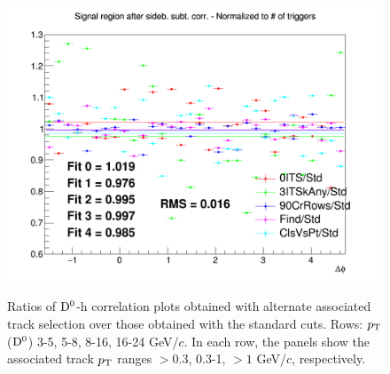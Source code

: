 \begin{figure}
{\includegraphics[width=0.31\linewidth]{figuresVsCent/Dzero/SystTrackEff/60_100/Ratio_AzimCorrDistr_Dzero_Canvas_PtIntBins12to12_PoolInt_thr1to99.png}} \\
 \caption{Ratios of ${\rm D^0}$-h correlation plots obtained with alternate associated track selection over those obtained with the standard cuts. Rows: $p_{\rm T}$(${\rm D^0}$) 3-5, 5-8, 8-16, 16-24 GeV/$c$. In each row, the panels show the associated track
$p_{\rm T}$ ranges $> 0.3$, 0.3-1, $> 1$ GeV/$c$, respectively.}
\label{fig:SysTrEff60100}
\end{figure}
